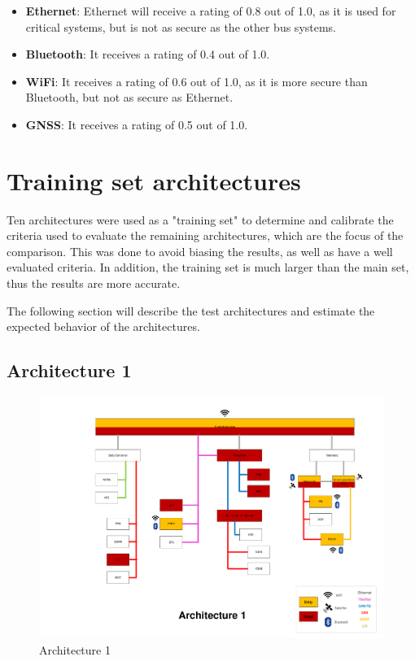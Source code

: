 \begin{itemize}
    \item \textbf{Ethernet}: Ethernet will receive a rating of 0.8 out of 1.0, as it is used for critical systems, but is not as secure as the other bus systems.
    
    \item \textbf{Bluetooth}: It receives a rating of 0.4 out of 1.0.

    \item \textbf{WiFi}: It receives a rating of 0.6 out of 1.0, as it is more secure than Bluetooth, but not as secure as Ethernet.
    
    \item \textbf{GNSS}: It receives a rating of 0.5 out of 1.0.
\end{itemize}
    
\section{Training set architectures}
\label{sec:trainingarch}

Ten architectures were used as a "training set" to determine and calibrate the criteria used to 
evaluate the remaining architectures, which are the focus of the comparison.
This was done to avoid biasing the results, as well as have a well evaluated criteria.
In addition, the training set is much larger than the main set, thus the results are more accurate.

The following section will describe the test architectures and estimate the expected behavior of the architectures.

\subsection*{Architecture 1}
\label{sec:arch1}

\begin{figure}[h!]
    \caption{Architecture 1}
    \includegraphics[width=\textwidth, page=1]{../Architectures-survey.pdf}
\end{figure}

